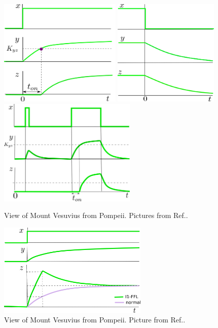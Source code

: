 \begin{figure}[h!]
\centering
\includegraphics[height=2in]
{autoregulons/c1-ffl-up-green.png}
\includegraphics[height=2in]
{autoregulons/c1-ffl-down-green.png}
\includegraphics[height=2in]
{autoregulons/c1-ffl-up-down-green.png}
\caption{View of Mount Vesuvius from
  Pompeii.
  Pictures from Ref.\cite{alon-book}.}
\label{fig-c1-ffl-triple}
\end{figure}


\begin{figure}[h!]
\centering
\includegraphics[width=2.8in]
{autoregulons/i1-ffl-green.png}
\caption{View of Mount Vesuvius from
  Pompeii.
  Picture from Ref.\cite{alon-book}.}
\label{fig-i1-ffl}
\end{figure}

